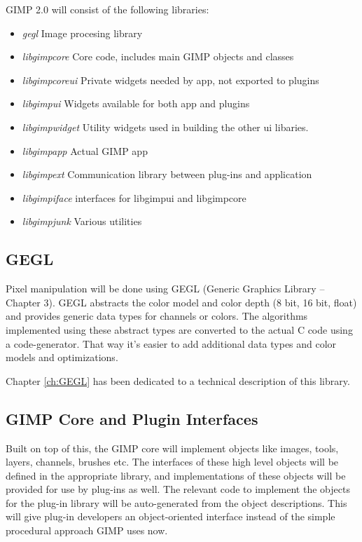 GIMP 2.0 will consist of the following libraries: 
\begin{itemize}
\item {\em gegl} Image procesing library 
\item {\em libgimpcore} Core code, includes main GIMP objects and classes  
\item {\em libgimpcoreui} Private widgets needed by app, not exported to plugins 
\item {\em libgimpui} Widgets available for both app and plugins 
\item {\em libgimpwidget} Utility widgets used in building the other ui libaries. 
\item {\em libgimpapp} Actual GIMP app
\item {\em libgimpext} Communication library between plug-ins and application
\item {\em libgimpiface} interfaces for libgimpui and libgimpcore
\item {\em libgimpjunk} Various utilities 
\end{itemize}

\subsection{GEGL}

Pixel manipulation will be done using GEGL (Generic Graphics Library -- Chapter
3). GEGL abstracts the color model and color depth (8 bit, 16 bit, float) and
provides generic data types for channels or colors.  The algorithms implemented
using these abstract types are converted to the actual C code using a
code-generator. That way it's easier to add additional data types and color
models and optimizations.   

Chapter
\ref{ch:GEGL} has been dedicated to a technical description of this library.

\subsection{GIMP Core and Plugin Interfaces}

Built on top of this, the GIMP core will implement objects like images, tools,
layers, channels, brushes etc. The interfaces of these high level objects will
be defined in the appropriate library, and implementations of these objects
will be provided for use by plug-ins as well. The relevant code to implement
the objects for the plug-in library will be auto-generated from the object
descriptions.  This will give plug-in developers an object-oriented interface
instead of the simple procedural approach GIMP uses now.


